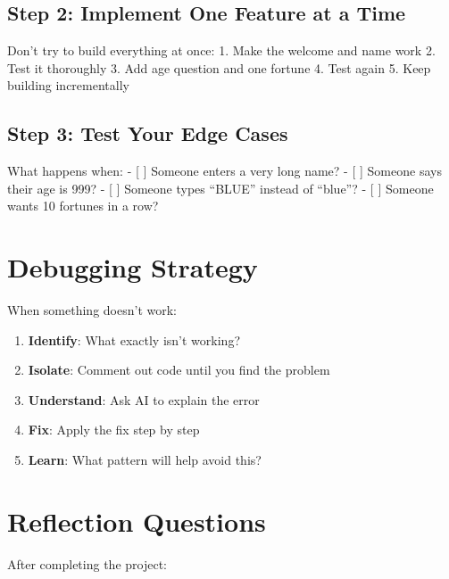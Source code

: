 \documentclass[
  letterpaper,
  DIV=11,
  numbers=noendperiod,
  oneside]{scrreprt}
\providecommand{\tightlist}{%
  \setlength{\itemsep}{0pt}\setlength{\parskip}{0pt}}\usepackage{longtable,booktabs,array}
\begin{document}
\subsection{Step 2: Implement One Feature at a
Time}\label{step-2-implement-one-feature-at-a-time}

Don't try to build everything at once: 1. Make the welcome and name work
2. Test it thoroughly 3. Add age question and one fortune 4. Test again
5. Keep building incrementally

\subsection{Step 3: Test Your Edge
Cases}\label{step-3-test-your-edge-cases}

What happens when: - {[} {]} Someone enters a very long name? - {[} {]}
Someone says their age is 999? - {[} {]} Someone types ``BLUE'' instead
of ``blue''? - {[} {]} Someone wants 10 fortunes in a row?

\section{Debugging Strategy}\label{debugging-strategy}

When something doesn't work:

\begin{enumerate}
\def\labelenumi{\arabic{enumi}.}
\tightlist
\item
  \textbf{Identify}: What exactly isn't working?
\item
  \textbf{Isolate}: Comment out code until you find the problem
\item
  \textbf{Understand}: Ask AI to explain the error
\item
  \textbf{Fix}: Apply the fix step by step
\item
  \textbf{Learn}: What pattern will help avoid this?
\end{enumerate}

\section{Reflection Questions}\label{reflection-questions}

After completing the project:
\end{document}
